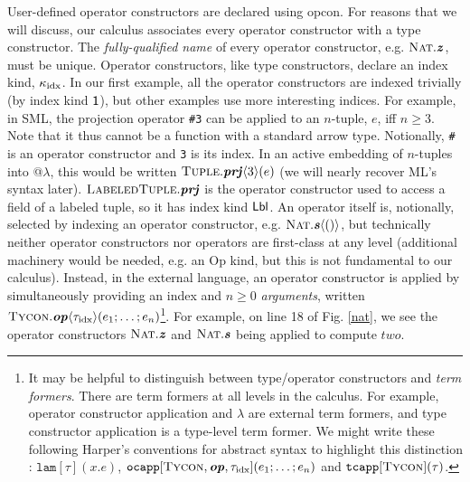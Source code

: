 User-defined operator constructors are declared using \textsf{opcon}.  For reasons that we will discuss, our calculus associates every operator  constructor with a type constructor. The \emph{fully-qualified name} of every operator constructor, e.g. $\textsc{Nat}.\textbf{\textit{z}}$, must be unique. Operator constructors, like type constructors, declare an index kind, $\kappa_{\text{idx}}$. In our first example, all the operator constructors are indexed trivially (by index kind $\textsf{1}$), but other examples use more interesting indices. For example, in SML, the projection operator \verb|#3| can be applied to an $n$-tuple, $e$, iff $n \geq 3$. Note that it thus cannot be a function with a standard arrow type. Notionally, \verb|#| is an operator constructor and \verb|3| is its index. In an active embedding of $n$-tuples into @$\lambda$, this would be written ${\textsc{Tuple}.\textbf{\textit{prj}}\langle3\rangle(e)}$ (we will nearly recover ML's syntax later). $\textsc{LabeledTuple}.\textbf{\textit{prj}}$ is the operator constructor used to access a field of a labeled tuple, so it has index kind $\textsf{Lbl}$. An operator itself is, notionally, selected by indexing an operator constructor, e.g. $\textsc{Nat}.\textbf{\textit{s}}\langle () \rangle$, but technically neither operator constructors nor operators are first-class at any level (additional machinery would be needed, e.g. an \textsf{Op} kind, but this is not fundamental to our calculus). 
Instead, in the external language, an operator constructor is applied by simultaneously providing an index and  $n \geq 0$ \emph{arguments}, written ${\textsc{Tycon}.\textbf{\textit{op}}\langle{\tau_{\text{idx}}}\rangle(e_{1};\ldots;e_{n})}$\footnote{It may be helpful to distinguish between type/operator constructors and \emph{term formers}. There are term formers at all levels in the calculus. For example, operator constructor application and $\lambda$ are  external term formers, and type constructor application is a type-level term former. We might write these following Harper's conventions for abstract syntax to highlight this distinction \cite{pfpl}: $\mathtt{lam}[\tau](x.e)$, $\mathtt{ocapp}[\textsc{Tycon}, \textbf{\textit{op}}, {\tau_{\text{idx}}}](e_{1};\ldots;e_{n})$ and $\texttt{tcapp}[\textsc{Tycon}](\tau)$.}. For example, on line 18 of Fig. \ref{nat}, we see the operator constructors $\textsc{Nat}.\textbf{\textit{z}}$ and $\textsc{Nat}.\textbf{\textit{s}}$ being applied to compute $two$. %

